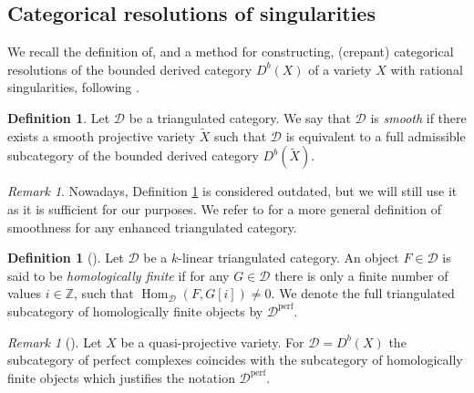 \documentclass[a4paper, twoside, 11pt]{amsart}
\theoremstyle{definition}
\newtheorem{definition}[theorem]{Definition}
\theoremstyle{remark}
\newtheorem{remark}[theorem]{Remark}
\numberwithin{equation}{theorem}
\DeclareMathOperator{\Hom}{Hom}
\DeclareMathOperator{\lilperf}{perf}
\newcommand{\dbx}{D^b(X)}
\begin{document}
\subsection{Categorical resolutions of singularities}
We recall the definition of, and a method for constructing, (crepant) categorical resolutions of the bounded derived category $\dbx$ of a variety $X$ with rational singularities, following \cite{Lefschetz_Decomp}. 
\begin{definition}\label{smooth_triang}
	Let $\mathcal{D}$ be a triangulated category. We say that $\mathcal{D}$ is \textit{smooth} if there exists a smooth projective variety $\widetilde{X}$ such that $\mathcal{D}$ is equivalent to a full admissible subcategory of the bounded derived category $D^b(\widetilde{X})$.
\end{definition}
\begin{remark}
	Nowadays, Definition \ref{smooth_triang} is considered outdated, but we will still use it as it is sufficient for our purposes. We refer to \cite[Definition 3.23]{Orlov_smooth} for a more general definition of smoothness for any enhanced triangulated category. 
\end{remark}
\begin{definition}[{\cite[Definition 1.6]{Orlov_perf}}]\label{defi_hom_finite}
	Let $\mathcal{D}$ be a $k$-linear triangulated category. An object $F \in \mathcal{D}$ is said to be \textit{homologically finite} if for any $G \in \mathcal{D}$ there is only a finite number of values $i \in \mathbb{Z}$, such that  $\Hom_{\mathcal{D}}(F,G[i]) \neq 0$. We denote the full triangulated subcategory of homologically finite objects by $\mathcal{D}^{\lilperf}$. 
\end{definition}
\begin{remark}[{\cite[Lemma 1.11]{Orlov_perf}}]
	Let $X$ be a quasi-projective variety. For $\mathcal{D} = \dbx$ the subcategory of perfect complexes coincides with the subcategory of homologically finite objects which justifies the notation $\mathcal{D}^{\lilperf}$. 
\end{remark}
\end{document}
